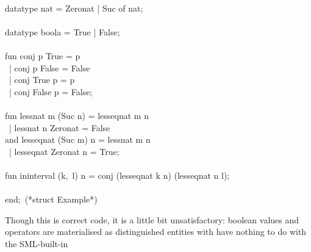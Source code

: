 \begin{isabellebody}
\begin{isamarkuptext}
\hspace*{0pt}\\
\hspace*{0pt}datatype nat = Zero{}nat | Suc of nat;\\
\hspace*{0pt}\\
\hspace*{0pt}datatype boola = True | False;\\
\hspace*{0pt}\\
\hspace*{0pt}fun conj p True = p\\
\hspace*{0pt} ~| conj p False = False\\
\hspace*{0pt} ~| conj True p = p\\
\hspace*{0pt} ~| conj False p = False;\\
\hspace*{0pt}\\
\hspace*{0pt}fun less{}nat m (Suc n) = less{}eq{}nat m n\\
\hspace*{0pt} ~| less{}nat n Zero{}nat = False\\
\hspace*{0pt}and less{}eq{}nat (Suc m) n = less{}nat m n\\
\hspace*{0pt} ~| less{}eq{}nat Zero{}nat n = True;\\
\hspace*{0pt}\\
\hspace*{0pt}fun in{}interval (k,~l) n = conj (less{}eq{}nat k n) (less{}eq{}nat n l);\\
\hspace*{0pt}\\
\hspace*{0pt}end;~(*struct Example*)%
\end{isamarkuptext}%
\isamarkuptrue%
%
\endisatagquote
{\isafoldquote}%
%
\isadelimquote
%
\endisadelimquote
%
\begin{isamarkuptext}%
\noindent Though this is correct code, it is a little bit
  unsatisfactory: boolean values and operators are materialised as
  distinguished entities with have nothing to do with the SML-built-in

\end{isamarkuptext}
\end{isabellebody}
